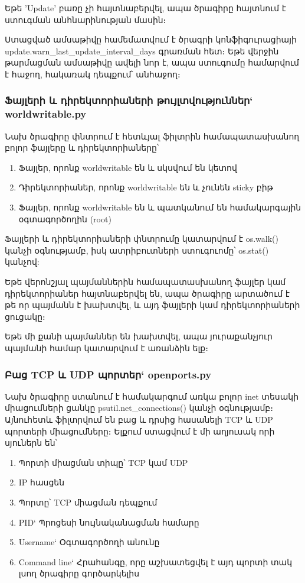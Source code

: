 \documentclass[a4paper,12pt]{article}
\begin{document}
\begin{sloppypar}
\begin{itemize}
	Եթե 'Update' բառը չի հայտնաբերվել, ապա ծրագիրը հայտնում է ստուգման անհնարինության մասին։
\end{itemize}

Ստացված ամսաթիվը համեմատվում է ծրագրի կոնֆիգուրացիայի
update.warn\_last\_update\_interval\_days
գրառման հետ։ Եթե վերջին թարմացման ամսաթիվը ավելի նոր է,
ապա ստուգումը համարվում է հաջող, հակառակ դեպքում՝ անհաջող։


\subsubsection{Ֆայլերի և դիրեկտորիաների թույլտվություններ` worldwritable.py}


Նախ ծրագիրը փնտրում է հետևյալ ֆիլտրին համապատասխանող բոլոր ֆայլերը և դիրեկտորիաները՝

\begin{enumerate}
\item Ֆայլեր, որոնք worldwritable են և սկսվում են կետով
\item Դիրեկտորիաներ, որոնք worldwritable են և չունեն sticky բիթ
\item Ֆայլեր, որոնք worldwritable են և պատկանում են համակարգային օգտագործողին (root)
\end{enumerate}

Ֆայլերի և դիրեկտորիաների փնտրումը կատարվում է os.walk() կանչի օգնությամբ,
իսկ ատրիբուտների ստուգուոմը՝ os.stat() կանչով:

Եթե վերոնշյալ պայմաններին համապատասխանող ֆայլեր կամ դիրեկտորիաներ հայտնաբերվել են,
ապա ծրագիրը արտածում է թե որ պայմանն է խախտվել, և այդ ֆայլերի կամ դիրեկտորիաների
ցուցակը։

Եթե մի քանի պայմաններ են խախտվել, ապա յուրաքանչյուր պայմանի համար կատարվում է
առանձին ելք։


\subsubsection{Բաց TCP և UDP պորտեր` openports.py}


Նախ ծրագիրը ստանում է համակարգում առկա բոլոր inet տեսակի միացումների ցանկը
psutil.net\_connections() կանչի օգնությամբ։
Այնուհետև ֆիլտրվում են բաց և դրսից հասանելի TCP և UDP պորտերի միացումները։
Ելքում ստացվում է մի աղյուսակ որի սյուներն են՝

\begin{enumerate}
\item Պորտի միացման տիպը՝ TCP կամ UDP
\item IP հասցեն
\item Պորտը՝ TCP միացման դեպքում
\item PID` Պրոցեսի նույնականացման համարը
\item Username` Օգտագործողի անունը
\item Command line` Հրահանգը, որը աշխատեցվել է այդ պորտի տակ լսող ծրագիրը
	գործարկելիս
\end{enumerate}



\end{sloppypar}
\end{document}
